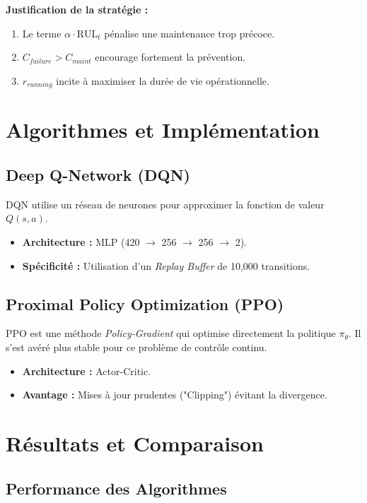 \documentclass[11pt,a4paper]{report}
\begin{document}
\begin{successbox}
\textbf{Justification de la stratégie :}
\begin{enumerate}
    \item Le terme $\alpha \cdot \text{RUL}_t$ pénalise une maintenance trop précoce.
    \item $C_{failure} > C_{maint}$ encourage fortement la prévention.
    \item $r_{running}$ incite à maximiser la durée de vie opérationnelle.
\end{enumerate}
\end{successbox}

\chapter{Algorithmes et Implémentation}

\section{Deep Q-Network (DQN)}
DQN utilise un réseau de neurones pour approximer la fonction de valeur $Q(s, a)$.
\begin{itemize}
    \item \textbf{Architecture :} MLP (420 $\to$ 256 $\to$ 256 $\to$ 2).
    \item \textbf{Spécificité :} Utilisation d'un \emph{Replay Buffer} de 10,000 transitions.
\end{itemize}

\section{Proximal Policy Optimization (PPO)}
PPO est une méthode \emph{Policy-Gradient} qui optimise directement la politique $\pi_\theta$. Il s'est avéré plus stable pour ce problème de contrôle continu.
\begin{itemize}
    \item \textbf{Architecture :} Actor-Critic.
    \item \textbf{Avantage :} Mises à jour prudentes ("Clipping") évitant la divergence.
\end{itemize}

\chapter{Résultats et Comparaison}

\section{Performance des Algorithmes}
\end{document}
